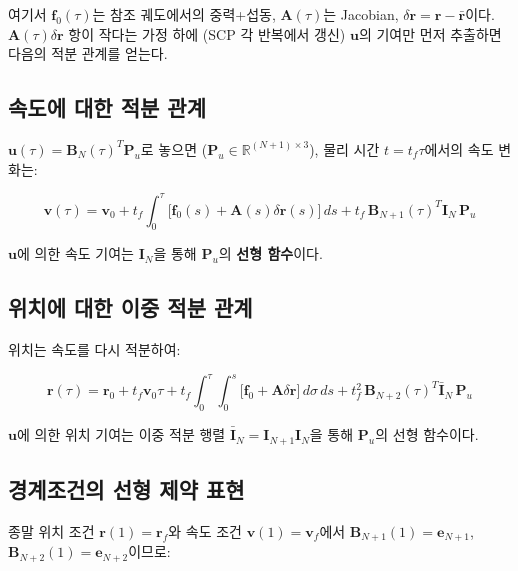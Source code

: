 \documentclass[11pt]{article}
\begin{document}
여기서 $\mathbf{f}_0(\tau)$는 참조 궤도에서의 중력+섭동, $\mathbf{A}(\tau)$는 Jacobian,
$\delta\mathbf{r} = \mathbf{r} - \bar{\mathbf{r}}$이다.
$\mathbf{A}(\tau)\delta\mathbf{r}$ 항이 작다는 가정 하에 (SCP 각 반복에서 갱신)
$\mathbf{u}$의 기여만 먼저 추출하면 다음의 적분 관계를 얻는다.

\subsection{속도에 대한 적분 관계}

$\mathbf{u}(\tau) = \mathbf{B}_N(\tau)^T \mathbf{P}_u$로 놓으면 ($\mathbf{P}_u \in \mathbb{R}^{(N+1)\times 3}$),
물리 시간 $t = t_f \tau$에서의 속도 변화는:

\begin{equation}
  \mathbf{v}(\tau) = \mathbf{v}_0 + t_f \int_0^\tau \bigl[\mathbf{f}_0(s) + \mathbf{A}(s)\delta\mathbf{r}(s)\bigr]\,ds
  + t_f\,\mathbf{B}_{N+1}(\tau)^T \mathbf{I}_N\, \mathbf{P}_u
  \label{eq:velocity_integral}
\end{equation}

$\mathbf{u}$에 의한 속도 기여는 $\mathbf{I}_N$을 통해 $\mathbf{P}_u$의 \textbf{선형 함수}이다.

\subsection{위치에 대한 이중 적분 관계}

위치는 속도를 다시 적분하여:

\begin{equation}
  \mathbf{r}(\tau) = \mathbf{r}_0 + t_f \mathbf{v}_0 \tau
  + t_f \int_0^\tau\!\int_0^s \bigl[\mathbf{f}_0 + \mathbf{A}\delta\mathbf{r}\bigr]\,d\sigma\,ds
  + t_f^2\,\mathbf{B}_{N+2}(\tau)^T \bar{\mathbf{I}}_N\, \mathbf{P}_u
  \label{eq:position_integral}
\end{equation}

$\mathbf{u}$에 의한 위치 기여는 이중 적분 행렬 $\bar{\mathbf{I}}_N = \mathbf{I}_{N+1}\mathbf{I}_N$을 통해
$\mathbf{P}_u$의 선형 함수이다.

\subsection{경계조건의 선형 제약 표현}

종말 위치 조건 $\mathbf{r}(1) = \mathbf{r}_f$와 속도 조건 $\mathbf{v}(1) = \mathbf{v}_f$에서
$\mathbf{B}_{N+1}(1) = \mathbf{e}_{N+1}$, $\mathbf{B}_{N+2}(1) = \mathbf{e}_{N+2}$이므로:
\end{document}
